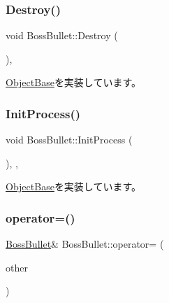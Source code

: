\subsubsection{\texorpdfstring{Destroy()}{Destroy()}}
{\footnotesize\ttfamily void Boss\+Bullet\+::\+Destroy (\begin{DoxyParamCaption}{ }\end{DoxyParamCaption})\hspace{0.3cm}{\ttfamily [final]}, {\ttfamily [virtual]}}



\mbox{\hyperlink{class_object_base_a7fa4c548153c3af20f89673ffea809af}{Object\+Base}}を実装しています。

\mbox{\label{class_boss_bullet_a8d70eb5a70dcf3d09baf646ae1bcb7f7}} 
\subsubsection{\texorpdfstring{Init\+Process()}{InitProcess()}}
{\footnotesize\ttfamily void Boss\+Bullet\+::\+Init\+Process (\begin{DoxyParamCaption}{ }\end{DoxyParamCaption})\hspace{0.3cm}{\ttfamily [final]}, {\ttfamily [protected]}, {\ttfamily [virtual]}}



\mbox{\hyperlink{class_object_base_af133f36f2bca1dcfd962e2cfac61ab51}{Object\+Base}}を実装しています。

\mbox{\label{class_boss_bullet_ab71ff0c91873433ba21e912c85800e1e}} 
\subsubsection{\texorpdfstring{operator=()}{operator=()}}
{\footnotesize\ttfamily \mbox{\hyperlink{class_boss_bullet}{Boss\+Bullet}}\& Boss\+Bullet\+::operator= (\begin{DoxyParamCaption}\item[{const \mbox{\hyperlink{class_boss_bullet}{Boss\+Bullet}} \&}]{other }\end{DoxyParamCaption})\hspace{0.3cm}{\ttfamily [inline]}}



